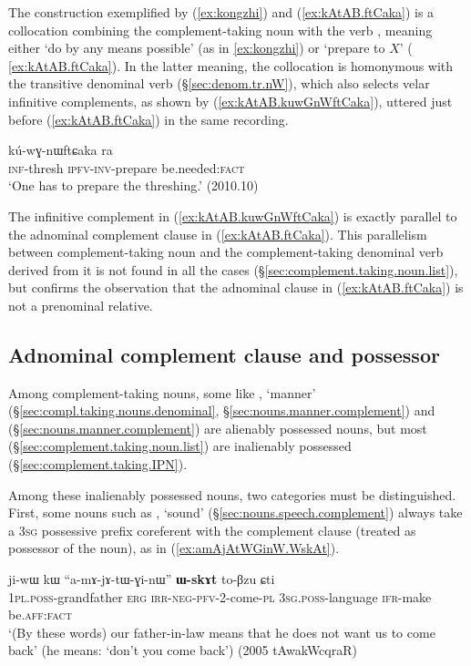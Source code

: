 The construction exemplified by (\ref{ex:kongzhi}) and (\ref{ex:kAtAB.ftCaka}) is a collocation combining the complement-taking noun  with the verb , meaning either  `do by any means possible' (as in \ref{ex:kongzhi}) or `prepare to $X$' ( \ref{ex:kAtAB.ftCaka}). In the latter meaning, the collocation is  homonymous with the transitive denominal verb  (§\ref{sec:denom.tr.nW}), which also selects velar infinitive complements, as shown by (\ref{ex:kAtAB.kuwGnWftCaka}), uttered just before (\ref{ex:kAtAB.ftCaka}) in the same recording.

 \begin{exe}
\ex \label{ex:kAtAB.kuwGnWftCaka}
\gll [kɤ-tɤβ] kú-wɣ-nɯftɕaka ra \\
\textsc{inf}-thresh \textsc{ipfv}-\textsc{inv}-prepare be.needed:\textsc{fact} \\
\glt `One has to prepare the threshing.'  (2010.10)
\end{exe}

The infinitive complement  in (\ref{ex:kAtAB.kuwGnWftCaka}) is exactly parallel to the adnominal complement clause in (\ref{ex:kAtAB.ftCaka}). This parallelism between complement-taking noun and the complement-taking denominal verb derived from it is not found in all the cases (§\ref{sec:complement.taking.noun.list}), but confirms the observation that the adnominal clause in (\ref{ex:kAtAB.ftCaka}) is not a prenominal relative.

\subsection{Adnominal complement clause and possessor} \label{sec:complement.taking.noun.possessor}
Among complement-taking nouns, some like , `manner' (§\ref{sec:compl.taking.nouns.denominal}, §\ref{sec:nouns.manner.complement}) and  (§\ref{sec:nouns.manner.complement}) are alienably possessed nouns, but most (§\ref{sec:complement.taking.noun.list}) are inalienably possessed (§\ref{sec:complement.taking.IPN}).

Among these inalienably possessed nouns, two categories must be distinguished. First, some nouns such as , `sound' (§\ref{sec:nouns.speech.complement}) always take a \textsc{3sg} possessive prefix coreferent with the complement clause (treated as possessor of the noun), as in (\ref{ex:amAjAtWGinW.WskAt}).

\begin{exe}
\ex \label{ex:amAjAtWGinW.WskAt}
\gll ji-wɯ kɯ ``a-mɤ-jɤ-tɯ-ɣi-nɯ'' \textbf{ɯ-skɤt} to-βzu ɕti \\
\textsc{1pl}.\textsc{poss}-grandfather \textsc{erg} \textsc{irr}-\textsc{neg}-\textsc{pfv}-2-come-\textsc{pl} \textsc{3sg}.\textsc{poss}-language \textsc{ifr}-make be.\textsc{aff}:\textsc{fact} \\
\glt `(By these words) our father-in-law means that he does not want us to come back' (he means: `don't you come back') (2005 tAwakWcqraR)
\end{exe}

